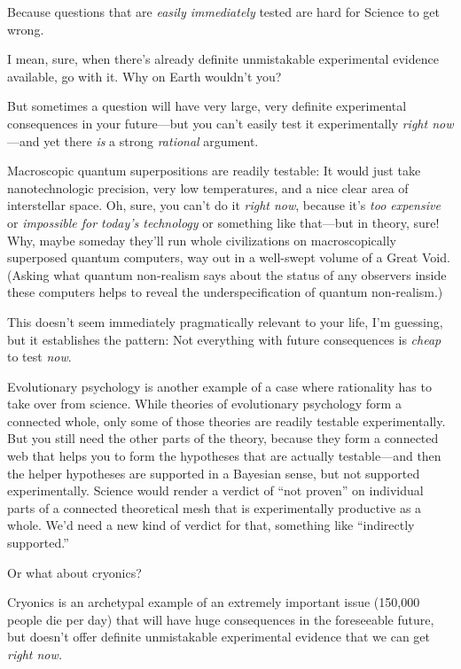 {
 Because questions that are \textit{easily immediately} tested are
hard for Science to get wrong.}

{
 I mean, sure, when there's already definite
unmistakable experimental evidence available, go with it. Why on Earth
wouldn't you?}

{
 But sometimes a question will have very large, very definite
experimental consequences in your future---but you
can't easily test it experimentally \textit{right
now}{}---and yet there \textit{is} a strong \textit{rational}
argument.}

{
 Macroscopic quantum superpositions are readily testable: It would
just take nanotechnologic precision, very low temperatures, and a nice
clear area of interstellar space. Oh, sure, you can't
do it \textit{right now}, because it's \textit{too
expensive} or \textit{impossible for today's
technology} or something like that---but in theory, sure! Why, maybe
someday they'll run whole civilizations on
macroscopically superposed quantum computers, way out in a well-swept
volume of a Great Void. (Asking what quantum non-realism says about the
status of any observers inside these computers helps to reveal the
underspecification of quantum non-realism.)}

{
 This doesn't seem immediately pragmatically
relevant to your life, I'm guessing, but it establishes
the pattern: Not everything with future consequences is \textit{cheap}
to test \textit{now}.}

{
 Evolutionary psychology is another example of a case where
rationality has to take over from science. While theories of
evolutionary psychology form a connected whole, only some of those
theories are readily testable experimentally. But you still need the
other parts of the theory, because they form a connected web that helps
you to form the hypotheses that are actually testable---and then the
helper hypotheses are supported in a Bayesian sense, but not supported
experimentally. Science would render a verdict of
``not proven'' on individual parts
of a connected theoretical mesh that is experimentally productive as a
whole. We'd need a new kind of verdict for that,
something like ``indirectly
supported.''}

{
 Or what about cryonics?}

{
 Cryonics is an archetypal example of an extremely important issue
(150,000 people die per day) that will have huge consequences in the
foreseeable future, but doesn't offer definite
unmistakable experimental evidence that we can get \textit{right now.}}

